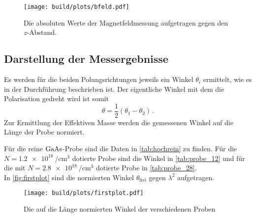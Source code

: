     \begin{figure}[H]
        \centering
        \texttt{[image: build/plots/bfeld.pdf]}
        \caption{Die absoluten Werte der Magnetfeldmessung aufgetragen gegen den $z$-Abstand.}
        \label{fig:bfeld}
    \end{figure}

\subsection{Darstellung der Messergebnisse}

    \noindent Es werden für die beiden Polungsrichtungen jeweils ein Winkel $\theta_i$ ermittelt, wie es in der Durchführung beschrieben ist. 
    Der eigentliche Winkel mit dem die Polarisation gedreht wird ist somit 
    \begin{equation*}
        \theta = \frac{1}{2}\left( \theta_1 - \theta_2\right)\, .
    \end{equation*}
    Zur Ermittlung der Effektiven Masse werden die gemessenen Winkel auf die Länge der Probe normiert. 

    \noindent Für die reine $\ce{GaAs}$-Probe sind die Daten in \autoref{tab:hochrein} zu finden. Für die $N = \SI{1.2e18}{\per\centi\metre\tothe{3}}$ dotierte 
    Probe sind die Winkel in \autoref{tab:probe_12} und für die mit $N = \SI{2.8e18}{\per\centi\metre\tothe{3}}$ dotierte Probe in \autoref{tab:probe_28}. \\
    In \autoref{fig:firstplot} sind die normierten Winkel $\theta_\text{frei}$ gegen $\lambda^2$ aufgetragen. 

    \begin{figure}[H]
        \centering
        \texttt{[image: build/plots/firstplot.pdf]}
        \caption{Die auf die Länge normierten Winkel der verschiedenen Proben}
        \label{fig:firstplot}
    \end{figure}

